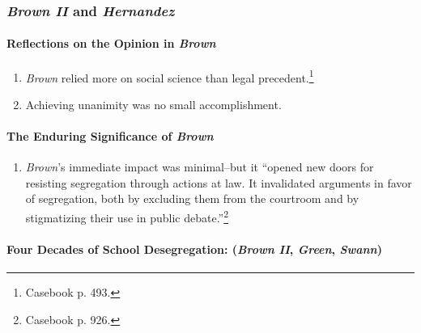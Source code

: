 \subsubsection{\emph{Brown II} and \emph{Hernandez}}

\paragraph{Reflections on the Opinion in \emph{Brown}}

\begin{enumerate}
    \item \emph{Brown} relied more on social science than legal 
    precedent.\footnote{Casebook p. 493.}
    \item Achieving unanimity was no small accomplishment.
\end{enumerate}
 
\paragraph{The Enduring Significance of \emph{Brown}}

\begin{enumerate}
    \item \emph{Brown}'s immediate impact was minimal--but it ``opened new 
    doors for resisting segregation through actions at law. It invalidated 
    arguments in favor of segregation, both by excluding them from the 
    courtroom and by stigmatizing their use in public 
    debate.''\footnote{Casebook p. 926.}
\end{enumerate}

\paragraph{Four Decades of School Desegregation: (\emph{Brown II}, 
\emph{Green}, \emph{Swann})}

